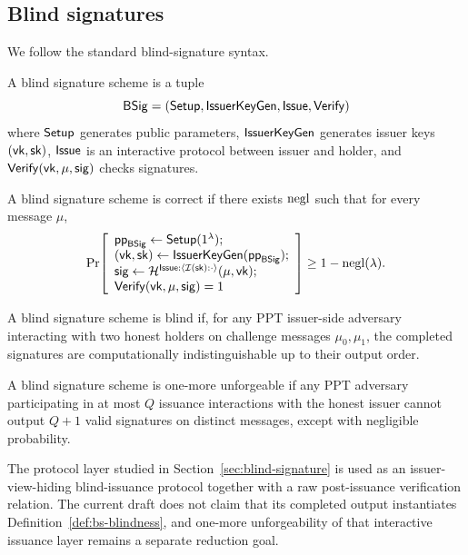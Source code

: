 \subsection{Blind signatures}
\label{subsec:blind-sig-defs}
We follow the standard blind-signature syntax.

\begin{definition}\label{def:bs-syntax}
A blind signature scheme is a tuple
\[
  \mathsf{BSig}=(\mathsf{Setup},\mathsf{IssuerKeyGen},\mathsf{Issue},\mathsf{Verify})
\]
where $\mathsf{Setup}$ generates public parameters, $\mathsf{IssuerKeyGen}$ generates issuer keys $(\mathsf{vk},\mathsf{sk})$, $\mathsf{Issue}$ is an
interactive protocol between issuer and holder, and $\mathsf{Verify}(\mathsf{vk},\mu,\mathsf{sig})$ checks signatures.
\end{definition}

\begin{definition}\label{def:bs-correctness}
A blind signature scheme is correct if there exists $\mathrm{negl}$ such that for every message $\mu$,
\[
\Pr\!\left[
\begin{array}{l}
  \mathsf{pp}_{\mathsf{BSig}} \gets \mathsf{Setup}(1^\lambda);\\
  (\mathsf{vk},\mathsf{sk})\gets \mathsf{IssuerKeyGen}(\mathsf{pp}_{\mathsf{BSig}});\\
  \mathsf{sig}\gets \mathcal{H}^{\mathsf{Issue}:\langle \mathcal{I}(\mathsf{sk}):\cdot\rangle}(\mu,\mathsf{vk});\\
  \mathsf{Verify}(\mathsf{vk},\mu,\mathsf{sig})=1
\end{array}
\right]
\ge 1-\mathrm{negl}(\lambda).
\]
\end{definition}

\begin{definition}[Blindness]\label{def:bs-blindness}
A blind signature scheme is blind if, for any PPT issuer-side adversary interacting with two honest holders on
challenge messages $\mu_0,\mu_1$, the completed signatures are computationally indistinguishable up to their
output order.
\end{definition}

\begin{definition}\label{def:bs-one-more}
A blind signature scheme is one-more unforgeable if any PPT adversary participating in at most $Q$ issuance
interactions with the honest issuer cannot output $Q+1$ valid signatures on distinct messages, except with
negligible probability.
\end{definition}

\begin{remark}\label{rem:bs-scope}
The protocol layer studied in Section~\ref{sec:blind-signature} is used as an issuer-view-hiding blind-issuance
protocol together with a raw post-issuance verification relation.  The current draft does not claim that its
completed output instantiates Definition~\ref{def:bs-blindness}, and one-more unforgeability of that
interactive issuance layer remains a separate reduction goal.
\end{remark}

